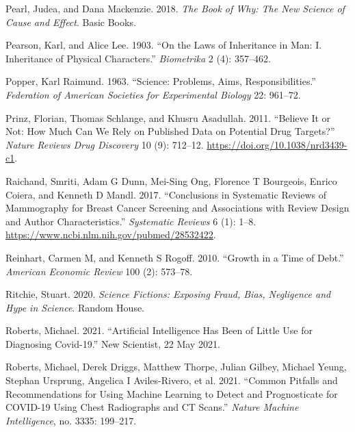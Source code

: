 \documentclass[
  10ptls,
  b5paper]{book}
\newlength{\cslhangindent}
\newlength{\cslentryspacingunit} %
\newenvironment{CSLReferences}[2] %
 {%
  \setlength{\parindent}{0pt}
  \ifodd #1
  \let\oldpar\par
  \def\par{\hangindent=\cslhangindent\oldpar}
  \fi
  \setlength{\parskip}{#2\cslentryspacingunit}
 }%
 {}
\begin{document}
\begin{CSLReferences}{1}{0}
\leavevmode{}%
Pearl, Judea, and Dana Mackenzie. 2018. \emph{The Book of Why: The New Science of Cause and Effect}. Basic Books.

\leavevmode{}%
Pearson, Karl, and Alice Lee. 1903. {``On the Laws of Inheritance in Man: I. Inheritance of Physical Characters.''} \emph{Biometrika} 2 (4): 357--462.

\leavevmode{}%
Popper, Karl Raimund. 1963. {``Science: Problems, Aims, Responsibilities.''} \emph{Federation of American Societies for Experimental Biology} 22: 961--72.

\leavevmode{}%
Prinz, Florian, Thomas Schlange, and Khusru Asadullah. 2011. {``Believe It or Not: How Much Can We Rely on Published Data on Potential Drug Targets?''} \emph{Nature Reviews Drug Discovery} 10 (9): 712--12. \url{https://doi.org/10.1038/nrd3439-c1}.

\leavevmode{}%
Raichand, Smriti, Adam G Dunn, Mei-Sing Ong, Florence T Bourgeois, Enrico Coiera, and Kenneth D Mandl. 2017. {``Conclusions in Systematic Reviews of Mammography for Breast Cancer Screening and Associations with Review Design and Author Characteristics.''} \emph{Systematic Reviews} 6 (1): 1--8. \url{https://www.ncbi.nlm.nih.gov/pubmed/28532422}.

\leavevmode{}%
Reinhart, Carmen M, and Kenneth S Rogoff. 2010. {``Growth in a Time of Debt.''} \emph{American Economic Review} 100 (2): 573--78.

\leavevmode{}%
Ritchie, Stuart. 2020. \emph{Science Fictions: Exposing Fraud, Bias, Negligence and Hype in Science}. Random House.

\leavevmode{}%
Roberts, Michael. 2021. {``Artificial Intelligence Has Been of Little Use for Diagnosing Covid-19.''} New Scientist, 22 May 2021.

\leavevmode{}%
Roberts, Michael, Derek Driggs, Matthew Thorpe, Julian Gilbey, Michael Yeung, Stephan Ursprung, Angelica I Aviles-Rivero, et al. 2021. {``Common Pitfalls and Recommendations for Using Machine Learning to Detect and Prognosticate for COVID-19 Using Chest Radiographs and CT Scans.''} \emph{Nature Machine Intelligence}, no. 3335: 199--217.


\end{CSLReferences}
\end{document}
